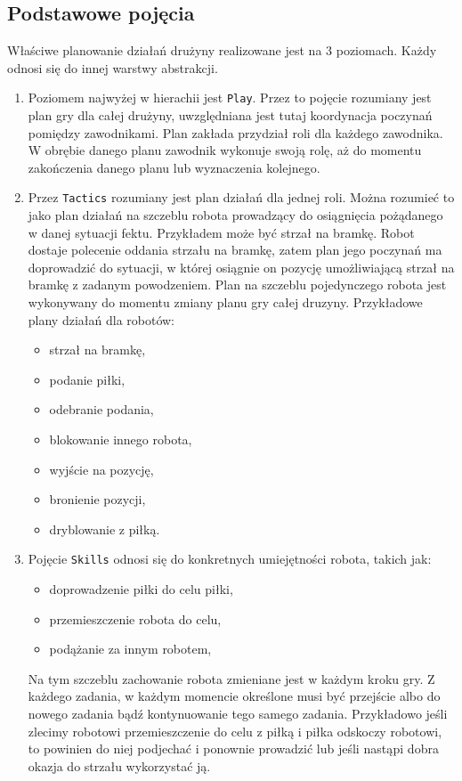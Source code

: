  \subsection*{Podstawowe pojęcia}
Właściwe planowanie działań drużyny realizowane jest na $3$ poziomach. Każdy odnosi się do innej warstwy abstrakcji.
\begin{enumerate}
  \item Poziomem najwyżej w hierachii jest \texttt{Play}. Przez to pojęcie rozumiany jest plan gry dla całej drużyny, uwzględniana jest tutaj koordynacja
  poczynań pomiędzy zawodnikami. Plan zakłada przydział roli dla każdego zawodnika. W obrębie danego planu zawodnik wykonuje swoją rolę, aż do momentu
  zakończenia danego planu lub wyznaczenia kolejnego.
  \item Przez \texttt{Tactics} rozumiany jest plan działań dla jednej roli. Można rozumieć to jako plan działań na szczeblu robota prowadzący
 do osiągnięcia pożądanego w danej sytuacji fektu. Przykładem może być strzał na bramkę. Robot dostaje polecenie oddania strzału na bramkę, zatem plan jego poczynań ma doprowadzić
 do sytuacji, w której osiągnie on pozycję umożliwiającą strzał na bramkę z zadanym powodzeniem.
 Plan na szczeblu pojedynczego robota jest wykonywany do momentu zmiany planu gry całej druzyny.
 Przykładowe plany działań dla robotów:
 \begin{itemize}
  \item strzał na bramkę,
  \item podanie piłki,
  \item odebranie podania,
  \item blokowanie innego robota,
  \item wyjście na pozycję,
  \item bronienie pozycji,
  \item dryblowanie z piłką.
 \end{itemize}

  \item Pojęcie \texttt{Skills} odnosi się do konkretnych umiejętności robota, takich jak:
    \begin{itemize}
    \item doprowadzenie piłki do celu piłki,
    \item przemieszczenie robota do celu,
    \item podążanie za innym robotem,
    \end{itemize}
  Na tym szczeblu zachowanie robota zmieniane jest w każdym kroku gry. Z każdego zadania, w każdym momencie określone musi być przejście
  albo do nowego zadania bądź kontynuowanie tego samego zadania. Przykładowo jeśli zlecimy robotowi przemieszczenie do celu z piłką i piłka 
  odskoczy robotowi, to powinien do niej podjechać i ponownie prowadzić lub jeśli nastąpi dobra okazja do strzału wykorzystać ją.
\end{enumerate}

